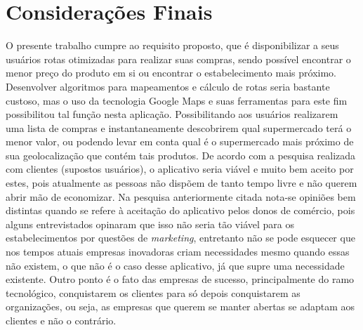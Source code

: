 \chapter{Considerações Finais}

O presente trabalho cumpre ao requisito proposto, que é disponibilizar a seus usuários rotas otimizadas para realizar suas compras, sendo possível encontrar o menor preço do produto em si ou encontrar o estabelecimento mais próximo.
Desenvolver algoritmos para mapeamentos e cálculo de rotas seria bastante custoso, mas o uso da tecnologia Google Maps e suas ferramentas para este fim possibilitou tal função nesta aplicação. Possibilitando aos usuários realizarem uma lista de compras e instantaneamente descobrirem qual supermercado terá o menor valor, ou podendo levar em conta qual é o supermercado mais próximo de sua geolocalização que contém tais produtos.
De acordo com a pesquisa realizada com clientes (supostos usuários), o aplicativo seria viável e muito bem aceito por estes, pois atualmente as pessoas não dispõem de tanto tempo livre e não querem abrir mão de economizar. Na pesquisa anteriormente citada nota-se opiniões bem distintas quando se refere à aceitação do aplicativo pelos donos de comércio, pois alguns entrevistados opinaram que isso não seria tão viável para os estabelecimentos por questões de \textit{marketing}, entretanto não se pode esquecer que nos tempos atuais empresas inovadoras criam necessidades mesmo quando essas não existem, o que não é o caso desse aplicativo, já que supre uma necessidade existente. Outro ponto é o fato das empresas de sucesso, principalmente do ramo tecnológico, conquistarem os clientes para só depois conquistarem as organizações, ou seja, as empresas que querem se manter abertas se adaptam aos clientes e não o contrário.